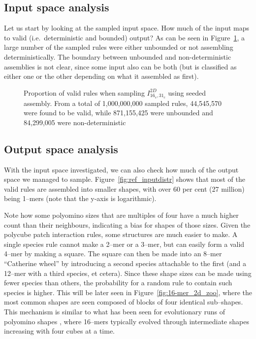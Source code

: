 \subsection{Input space analysis}

Let us start by looking at the sampled input space. How much of the input maps to valid (i.e.\ deterministic and bounded) output? As can be seen in Figure~\ref{fig:ref_validity}, a large number of the sampled rules were either unbounded or not assembling deterministically. The boundary between unbounded and non-deterministic assemblies is not clear, since some input also can be both (but is classified as either one or the other depending on what it assembled as first).

\begin{figure}[h]
    \centering
    \caption{Proportion of valid rules when sampling \(I_{16_s,31_c}^{2D}\) using seeded assembly. From a total of 1,000,000,000 sampled rules, 44,545,570 were found to be valid, while 871,155,425 were  unbounded and 84,299,005 were non-deterministic}
    \label{fig:ref_validity}
\end{figure}

\subsection{Output space analysis}

With the input space investigated, we can also check how much of the output space we managed to sample. Figure~\ref{fig:ref_inputdistr} shows that most of the valid rules are assembled into smaller shapes, with over 60 per cent (27 million) being 1--mers (note that the y-axis is logarithmic).

Note how some polyomino sizes that are multiples of four have a much higher count than their neighbours, indicating a bias for shapes of those sizes. Given the polycube patch interaction rules, some structures are much easier to make. A single species rule cannot make a 2--mer or a 3--mer, but can easily form a valid 4--mer by making a square. The square can then be made into an 8--mer ``Catherine wheel'' by introducing a second species attachable to the first (and a 12--mer with a third species, et cetera). Since these shape sizes can be made using fewer species than others, the probability for a random rule to contain such species is higher. This will be later seen in Figure~\ref{fig:16-mer_2d_zoo}, where the most common shapes are seen composed of blocks of four identical sub--shapes. This mechanism is similar to what has been seen for evolutionary runs of polyomino shapes \cite{johnston2011evolutionary}, where 16--mers typically evolved through intermediate shapes increasing with four cubes at a time.

